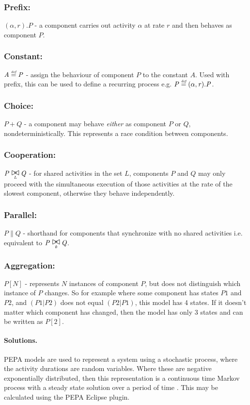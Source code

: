 \subsubsection{Prefix:} $(\mathit{\alpha},\mathit{r}).\mathit{P}$ - a component carries out activity $\mathit{\alpha}$ at rate $\mathit{r}$ and then behaves as component $\mathit{P}$.
\subsubsection{Constant:} $\mathit{A} \stackrel{\mbox{\em {\tiny def}}}{=} \mathit{P}$ - assign the behaviour of component $\mathit{P}$ to the constant $\mathit{A}$.  Used with prefix, this can be used to define a recurring process e.g. $\mathit{P} \stackrel{\mbox{\em {\tiny def}}}{=} (\mathit{\alpha},\mathit{r}).\mathit{P}$.
\subsubsection{Choice:} $\mathit{P} + \mathit{Q}$ - a component may behave {\itshape either} as component $\mathit{P}$ or $\mathit{Q}$, nondeterministically.  This represents a race condition between components.
\subsubsection{Cooperation:} $\mathit{P} \sync{L} \mathit{Q}$ - for shared activities in the set $\mathit{L}$, components $\mathit{P}$ and $\mathit{Q}$ may only proceed with the simultaneous execution of those activities at the rate of the slowest component, otherwise they behave independently.
\subsubsection{Parallel:} $\mathit{P} \parallel \mathit{Q}$ - shorthand for components that synchronize with no shared activities i.e. equivalent to $\mathit{P} \sync{\emptyset} \mathit{Q}$.
\subsubsection{Aggregation:} $\mathit{P}[N]$ - represents $\mathit{N}$ instances of component $\mathit{P}$, but does not distinguish which instance of $\mathit{P}$ changes.  So for example where some component has states $\mathit{P1}$ and $\mathit{P2}$, and $\mathit{(P1|P2)}$ does not equal $\mathit{(P2|P1)}$, this model has 4 states.  If it doesn't matter which component has changed, then the model has only 3 states and can be written as $\mathit{P}[2]$.

\paragraph{Solutions.} PEPA models are used to represent a system using a stochastic process, where the activity durations are random variables.  Where these are negative exponentially distributed, then this representation is a continuous time Markov process with a steady state solution over a period of time \cite{RN1051}.  This may be calculated using the PEPA Eclipse plugin.
